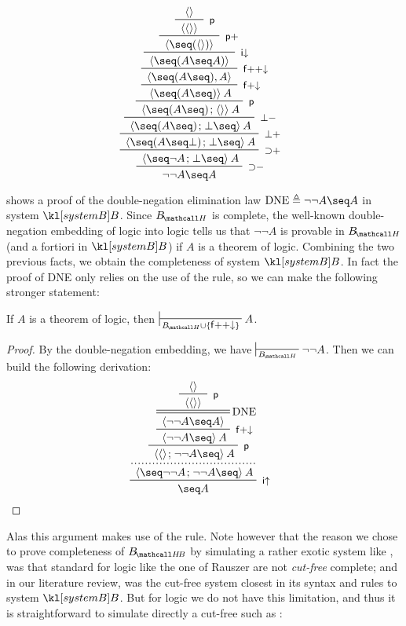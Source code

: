 
\begin{marginfigure}
  $$
  \R[{\limp}{-}]
  {\R[{\limp}{+}]
  {\R[{\bot}{+}]
  {\R[{\bot}{-}]
  {\R[\rsf{p}]
  {\R[\rsf{f{+}{\da}}]
  {\R[\rsf{f{+}{+}{\da}}]
  {\R[\rsf{i{\da}}]
  {\R[\rsf{p}{+}]
  {\R[\rsf{p}]
  {{} \piq{}}
  {{} \piq{\piq{}}}}
  {{} \piq{\seq (\piq{})}}}
  {{} \piq{\seq (A \seq A)}}}
  {{} \piq{\seq (A \seq), A}}}
  {{} \piq{\seq (A \seq)} A}}
  {{} \piq{\seq (A \seq) \sep \piq{}} A}}
  {{} \piq{\seq (A \seq) \sep \bot \seq} A}}
  {{} \piq{\seq (A \seq \bot) \sep \bot \seq} A}}
  {{} \piq{\seq \neg A \sep \bot \seq} A}}
  {\neg \neg A \seq A}
  $$
  \caption{Proof of DNE in system $\sysB$}
\end{marginfigure}

 shows a proof of the double-negation elimination law
$\mathrm{DNE} \defeq \neg \neg A \seq A$ in system $\sysB$. Since $\sysBH$ is
 complete, the well-known double-negation embedding of
 logic into  logic tells us that $\neg \neg A$ is
provable in $\sysBH$ (and a fortiori in $\sysB$) if $A$ is a theorem of
 logic. Combining the two previous facts, we obtain the 
completeness of system $\sysB$. In fact the proof of DNE only relies on the use
of the  rule, so we can make the following stronger
statement:

\begin{corollary}\label{cor:bubbles-completeness-classical}
  If $A$ is a theorem of  logic, then $\prov{\sysBH \cup
  \{\rsf{f{+}{+}{\da}}\}} A$.
\end{corollary}
\begin{proof}
  By the double-negation embedding, we have $\prov{\sysBH} \neg \neg A$. Then we
  can build the following derivation:
  $$
  \R[\rsf{i{\ua}}]
  {\prftree[dotted]
  {\R[\rsf{p}]
  {\R[\rsf{f{+}{\da}}]
  {\prftree[r][d]{DNE}  
  {\R[\rsf{p}]
  {{} \piq{}}
  {{} \piq{\piq{}}}}
  {{} \piq{\neg \neg A \seq A}}}
  {{} \piq{\neg \neg A \seq} A}}
  {{} \piq{\piq{} \sep \neg \neg A \seq} A}}
  {{} \piq{\seq \neg \neg A \sep \neg \neg A \seq} A}}
  {\seq A}
  $$
\end{proof}

Alas this argument makes use of the  rule. Note however that
the reason we chose to prove completeness of $\sysBHB$ by simulating a rather
exotic system like , was that standard  for
 logic like the one of Rauszer
 are not \emph{cut-free} complete; and in
our literature review,  was the cut-free system closest in its
syntax and rules to system $\sysB$. But for  logic we do not have this
limitation, and thus it is straightforward to simulate directly a cut-free
 such as  :


